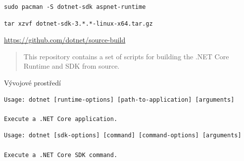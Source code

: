 \documentclass[utf8x]{beamer}
\begin{document}
\begin{frame}[fragile]
\begin{center}
\begin{verbatim}
sudo pacman -S dotnet-sdk aspnet-runtime
\end{verbatim}
\end{center}
\end{frame}

\begin{frame}[fragile]
\begin{center}
\begin{verbatim}
tar xzvf dotnet-sdk-3.*.*-linux-x64.tar.gz
\end{verbatim}
\end{center}
\end{frame}

\begin{frame}[fragile]
    \begin{center}
        \large
        \url{https://github.com/dotnet/source-build}
    \end{center}
    \begin{verse}
        This repository contains a set of scripts for building the .NET Core Runtime and SDK from source. 
    \end{verse}
\end{frame}

\begin{frame}
    \begin{center}
        \color{vulkan}
        \Huge \textrm{Vývojové prostředí}
    \end{center}
\end{frame}

\begin{frame}[fragile]
\begin{center}
\scriptsize
\begin{verbatim}
Usage: dotnet [runtime-options] [path-to-application] [arguments]

Execute a .NET Core application.
\end{verbatim}
\begin{verbatim}
Usage: dotnet [sdk-options] [command] [command-options] [arguments]

Execute a .NET Core SDK command.
\end{verbatim}
\end{center}
\end{frame}
\end{document}
